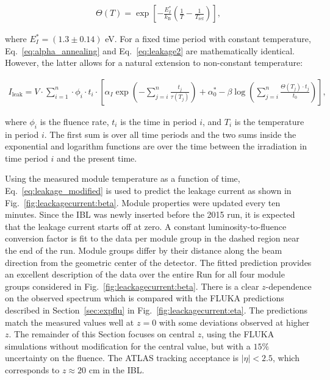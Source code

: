 \begin{align}
\label{eq:tempscaling}
\Theta(T) = \exp \left[ - \frac{E_I^*}{k_\text{B} } \left( \frac{1}{T} - \frac{1}{T_\text{ref} } \right) \right],
\end{align}

where $E_I^*=(1.3\pm 0.14)$ eV.  For a fixed time period with constant temperature, Eq.~\ref{eq:alpha_annealing} and Eq.~\ref{eq:leakage2} are mathematically identical.  However, the latter allows for a natural extension to non-constant temperature:

\begin{align}
\label{eq:leakage_modified}
I_\text{leak}=V\cdot\sum_{i=1}^n\cdot\phi_i\cdot t_i\cdot\left[\alpha_I\exp\left(-\sum_{j=i}^n\frac{t_j}{\tau(T_j)}\right)+\alpha_0^*-\beta\log\left(\sum_{j=i}^n\frac{\Theta(T_j)\cdot t_j }{ t_0}\right)\right],
\end{align}

where $\phi_i$ is the fluence rate, $t_i$ is the time in period $i$, and $T_i$ is the temperature in period $i$.  The first sum is over all time periods and the two sums inside the exponential and logarithm functions are over the time between the irradiation in time period $i$ and the present time.

Using the measured module temperature as a function of time, Eq.~\ref{eq:leakage_modified} is used to predict the leakage current as shown in Fig.~\ref{fig:leackagecurrent:beta}. Module properties were updated every ten minutes.  Since the IBL was newly inserted before the 2015 run, it is expected that the leakage current starts off at zero.  A constant luminosity-to-fluence conversion factor is fit to the data per module group in the dashed region near the end of the run.  Module groups differ by their distance along the beam direction from the geometric center of the detector.  The fitted prediction provides an excellent description of the data over the entire Run for all four module groups considered in Fig.~\ref{fig:leackagecurrent:beta}.  There is a clear $z$-dependence on the observed spectrum which is compared with the FLUKA predictions described in Section~\ref{sec:expflu} in Fig.~\ref{fig:leackagecurrent:eta}.  The predictions match the measured values well at $z=0$ with some deviations observed at higher $z$.  The remainder of this Section focuses on central $z$, using the FLUKA simulations without modification for the central value, but with a $15\%$ uncertainty on the fluence.  The ATLAS tracking acceptance is $|\eta|<2.5$, which corresponds to $z\approx 20$ cm in the IBL.

